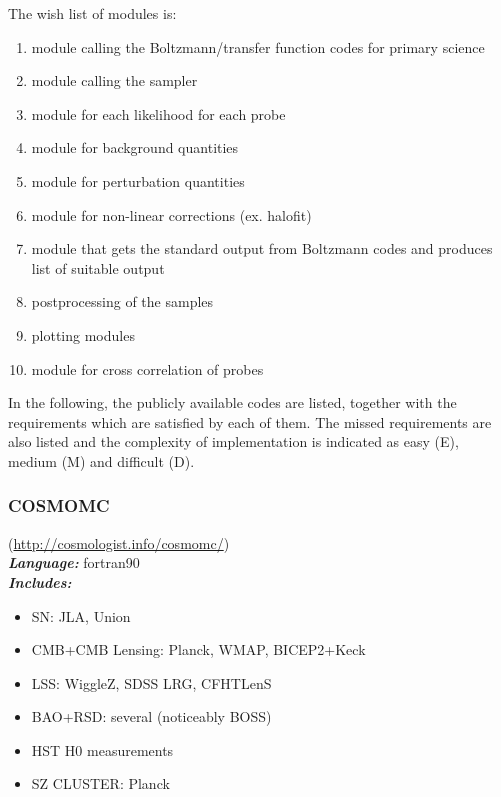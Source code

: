 The wish list of modules is:
\begin{enumerate}
 \item module calling the Boltzmann/transfer function codes for primary science
 \item module calling the sampler
 \item module for each likelihood for each probe
 \item module for background quantities
 \item module for perturbation quantities
 \item module for non-linear corrections (ex. halofit)
 \item module that gets the standard output from Boltzmann codes and produces list of suitable output
 \item postprocessing of the samples
 \item plotting modules 
 \item module for cross correlation of probes
\end{enumerate}

In the following, the publicly available codes are listed, together with the requirements which are satisfied by each of them. The missed requirements are also listed and the complexity 
of implementation is indicated as easy (E), medium (M) and difficult (D).

\newpage
\subsubsection{COSMOMC}
(\url{http://cosmologist.info/cosmomc/})\\

{\it \bf Language:} fortran90\\

{\it \bf Includes:}\\
\begin{itemize}
\item SN: JLA, Union
\item CMB+CMB Lensing: Planck, WMAP, BICEP2+Keck
\item LSS: WiggleZ, SDSS LRG, CFHTLenS
\item BAO+RSD: several (noticeably BOSS)
\item HST H0 measurements
\item SZ CLUSTER: Planck
\end{itemize}

